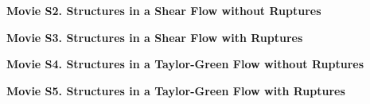 \noindent
{\bf Movie S2. Structures in a Shear Flow without Ruptures} 

\noindent
{\bf Movie S3. Structures in a Shear Flow with Ruptures} 


\noindent
{\bf Movie S4. Structures in a Taylor-Green Flow without Ruptures} 


\noindent
{\bf Movie S5. Structures in a Taylor-Green Flow with Ruptures} 

